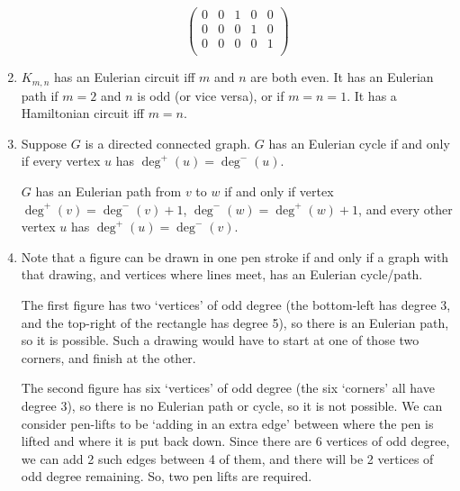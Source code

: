 \documentclass[a4paper,12pt]{article}
\begin{document}
\begin{enumerate}
\[\begin{pmatrix}
        0 & 0 & 1 & 0 & 0 \\
        0 & 0 & 0 & 1 & 0 \\
        0 & 0 & 0 & 0 & 1 \\
    \end{pmatrix}
    \]
\item
    $K_{m,n}$ has an Eulerian circuit iff $m$ and $n$ are both even. It has an
    Eulerian path if $m = 2$ and $n$ is odd (or vice versa), or if $m = n = 1$.
    It has a Hamiltonian circuit iff $m = n$.
\item
    Suppose $G$ is a directed connected graph.
    $G$ has an Eulerian cycle if and only if every vertex $u$ has
    $\deg^+(u) = \deg^-(u)$.

    $G$ has an Eulerian path from $v$ to $w$ if and
    only if vertex $\deg^+(v) = \deg^-(v) + 1$, $\deg^-(w) = \deg^+(w)+1$,
    and every other vertex $u$ has $\deg^+(u) = \deg^-(v)$.
\item
    Note that a figure can be drawn in one pen stroke if and only if a graph
    with that drawing, and vertices where lines meet, has an Eulerian
    cycle/path.

    The first figure has two `vertices' of odd degree (the bottom-left
    has degree 3, and the top-right of the rectangle has degree 5), so there
    is an Eulerian path, so it is possible. Such a drawing would have to start
    at one of those two corners, and finish at the other.

    The second figure has six `vertices' of odd degree (the six `corners' all
    have degree 3), so there is no Eulerian path or cycle, so it is not
    possible. We can consider pen-lifts to be `adding in an extra edge' between
    where the pen is lifted and where it is put back down. Since there are 6
    vertices of odd degree, we can add 2 such edges between 4 of them,
    and there will be 2 vertices of odd degree remaining. So, two pen lifts are
    required.
\end{enumerate}
\end{document}
